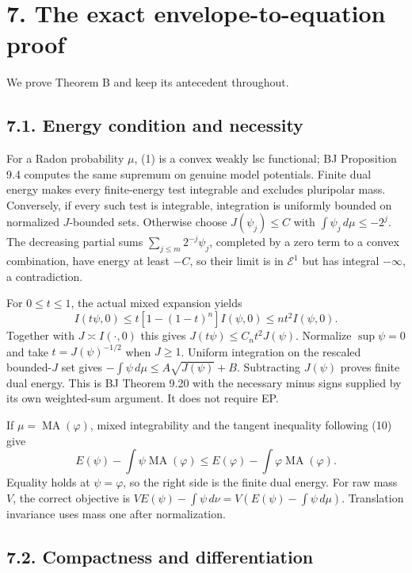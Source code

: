 \documentclass[
  11pt,
]{article}
\begin{document}
\section{7. The exact envelope-to-equation
proof}\label{the-exact-envelope-to-equation-proof}

We prove Theorem B and keep its antecedent throughout.

\subsection{7.1. Energy condition and
necessity}\label{energy-condition-and-necessity}

For a Radon probability \(\mu\), (1) is a convex weakly lsc functional;
BJ Proposition 9.4 computes the same supremum on genuine model
potentials. Finite dual energy makes every finite-energy test integrable
and excludes pluripolar mass. Conversely, if every such test is
integrable, integration is uniformly bounded on normalized \(J\)-bounded
sets. Otherwise choose \(J(\psi_j)\leq C\) with
\(\int\psi_j\,d\mu\leq-2^j\). The decreasing partial sums
\(\sum_{j\leq m}2^{-j}\psi_j\), completed by a zero term to a convex
combination, have energy at least \(-C\), so their limit is in
\(\mathcal E^1\) but has integral \(-\infty\), a contradiction.

For \(0\leq t\leq1\), the actual mixed expansion yields
\[I(t\psi,0)\leq t[1-(1-t)^n]I(\psi,0)\leq nt^2I(\psi,0).\] Together
with \(J\asymp I(\cdot,0)\) this gives \(J(t\psi)\leq C_n t^2J(\psi)\).
Normalize \(\sup\psi=0\) and take \(t=J(\psi)^{-1/2}\) when \(J\geq1\).
Uniform integration on the rescaled bounded-\(J\) set gives
\(-\int\psi\,d\mu\leq A\sqrt{J(\psi)}+B\). Subtracting \(J(\psi)\)
proves finite dual energy. This is BJ Theorem 9.20 with the necessary
minus signs supplied by its own weighted-sum argument. It does not
require EP.

If \(\mu=\operatorname{MA}(\varphi)\), mixed integrability and the
tangent inequality following (10) give
\[E(\psi)-\int\psi\operatorname{MA}(\varphi)
 \leq E(\varphi)-\int\varphi\operatorname{MA}(\varphi).\] Equality holds
at \(\psi=\varphi\), so the right side is the finite dual energy. For
raw mass \(V\), the correct objective is
\(VE(\psi)-\int\psi\,d\nu=V(E(\psi)-\int\psi\,d\mu)\). Translation
invariance uses mass one after normalization.

\subsection{7.2. Compactness and
differentiation}\label{compactness-and-differentiation}
\end{document}
